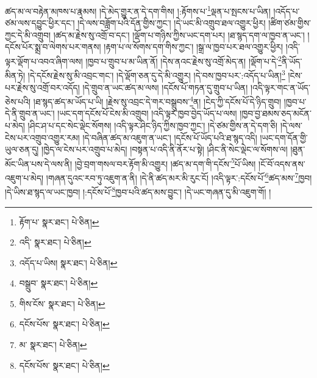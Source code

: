 ཚད་མ་ལ་བརྟེན་མཁས་པ་རྣམས། །དེ་མེད་གྱུར་ན་དེ་དག་གིས། །:རྟོགས་པ་\footnote{རྟོག་པ་  སྣར་ཐང་།  པེ་ཅིན། }ལྡན་པ་སྤངས་པ་ཡིན། །འདོད་པ་ཙམ་ལས་དབྱུང་ཕྱིར་དང་། །དེ་ལས་བཟློག་པའི་དོན་གྱིས་ཀྱང་། །དེ་ཡང་མི་འགྲུབ་ཐལ་འགྱུར་ཕྱིར། །ཚིག་ཙམ་གྱིས་ཀྱང་དེ་མི་འགྲུབ། །ཚད་མ་རྗེས་སུ་འགྲོ་བ་དང་། །ལྡོག་པ་གཉིས་ཀྱིས་ཡང་དག་པར། །ཐ་སྙད་དག་ལ་ཁྱབ་ན་ཡང་། །དངོས་པོར་སྨྲ་བ་ལེགས་པར་གནས། །རྟག་པ་ལ་སོགས་དག་གིས་ཀྱང་། །སྒྲ་ལ་ཁྱབ་པར་ཐལ་འགྱུར་ཕྱིར། །འདི་ལྟར་ལྡོག་པ་འབའ་ཞིག་ལས། །ཁྱབ་པ་གྲུབ་པ་མ་ཡིན་ནོ། །དེས་ནའང་རྗེས་སུ་འགྲོ་མེད་ན། །ལྡོག་པ་དེ་\footnote{འདི་  སྣར་ཐང་།  པེ་ཅིན། }ནི་ཡོད་མིན་ཏེ། །དེ་དངོས་རྗེས་སུ་མི་འབྲང་གང་། །དེ་ལྡོག་ཅན་དུ་དེ་མི་འགྱུར། །དེ་བས་ཁྱབ་པར་:འདོད་པ་ཡིན།\footnote{འདོད་པ་ཡིས།  སྣར་ཐང་།  པེ་ཅིན། } །ངེས་པར་རྗེས་སུ་འགྲོ་བར་འདོད། །དེ་གྲུབ་ན་ཡང་ཚད་མ་ལས། །དངོས་པོ་གཏན་དུ་གྲུབ་པ་ཡིན། །འདི་ལྟར་གང་ན་ཡོད་ཅེས་པའི། །ཐ་སྙད་ཚད་མ་ཡོད་པ་ཡི། །རྗེས་སུ་འབྲང་དེ་གར་བསྒྲུབས་\footnote{བསྒྲུབ་  སྣར་ཐང་།  པེ་ཅིན། }ན། །ངེད་ཀྱི་དངོས་པོ་དེ་ཉིད་གྲུབ། །ཁྱབ་པ་དེ་ནི་གྲུབ་ན་ཡང་། །ཡང་དག་དངོས་པོ་ངེས་མི་འགྲུབ། །འདི་ལྟར་ཁྱབ་བྱེད་ཡོད་པ་ལས། །ཁྱབ་བྱ་ཐམས་ཅད་མངོན་པ་མེད། །ཤིང་ཤ་པ་དང་སེང་ལྡེང་སོགས། །འདི་ལྟར་ཤིང་ཉིད་ཀྱིས་ཁྱབ་ཀྱང་། །དེ་ཙམ་གྱིས་ན་དེ་དག་ཅི། །དེ་ལས་ངེས་པར་འགྲུབ་འགྱུར་རམ། །དེ་བཞིན་ཚད་མ་འཇུག་ན་ཡང་། །དངོས་པོ་ཡོད་པའི་ཐ་སྙད་འདི། །ཡང་དག་དོན་གྱི་ཡུལ་ཅན་དུ། །ཁྱེད་ལ་ངེས་པར་འགྲུབ་པ་མེད། །བསྟན་པ་འདི་ནི་ནོར་པ་སྟེ། །ཤིང་ནི་སེང་ལྡེང་ལ་སོགས་ལ། །ཐུན་མོང་ཡིན་པས་དེ་ལས་ནི། །བྱེ་བྲག་གསལ་བར་རྟོག་མི་འགྱུར། །ཚད་མ་དག་གི་དངོས་\footnote{གིས་ངོས་  སྣར་ཐང་།  པེ་ཅིན། }པོ་ཡིས། །ངོ་བོ་འདས་ནས་འཇུག་པ་མེད། །གཞན་དུའང་རབ་ཏུ་འཇུག་ན་ནི། །དེ་ནི་ཚད་མར་མི་རུང་ངོ། །འདི་ལྟར་:དངོས་པོ་\footnote{དངོས་པོས་  སྣར་ཐང་།  པེ་ཅིན། }ཚད་མས་\footnote{མ་  སྣར་ཐང་།  པེ་ཅིན། }ཁྱབ། །དེ་ཡིས་ཐ་སྙད་ལ་ཡང་ཁྱབ། །:དངོས་པོ་\footnote{དངོས་པོས་  སྣར་ཐང་།  པེ་ཅིན། }ཁྱབ་པའི་ཚད་མས་བྱུང་། །དེ་ཡང་གཞན་དུ་མི་འཇུག་གོ། །
